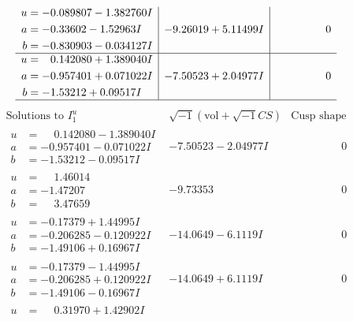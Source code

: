 \documentclass[1p]{elsarticle_modified}
\theoremstyle{definition}
\newcommand{\I}{\sqrt{-1}}
\begin{document}
$$\begin{array}{c|c|c}
\begin{aligned}
u &= -0.089807 - 1.382760 I \\
a &= -0.33602 - 1.52963 I \\
b &= -0.830903 - 0.034127 I\end{aligned}
 & -9.26019 + 5.11499 I & \phantom{-0.000000 } 0 \\ \hline\begin{aligned}
u &= \phantom{-}0.142080 + 1.389040 I \\
a &= -0.957401 + 0.071022 I \\
b &= -1.53212 + 0.09517 I\end{aligned}
 & -7.50523 + 2.04977 I & \phantom{-0.000000 } 0\\
 \hline 
 \end{array}$$\newpage$$\begin{array}{c|c|c}  
\text{Solutions to }I^u_{1}& \I (\text{vol} + \sqrt{-1}CS) & \text{Cusp shape}\\
 \hline 
\begin{aligned}
u &= \phantom{-}0.142080 - 1.389040 I \\
a &= -0.957401 - 0.071022 I \\
b &= -1.53212 - 0.09517 I\end{aligned}
 & -7.50523 - 2.04977 I & \phantom{-0.000000 } 0 \\ \hline\begin{aligned}
u &= \phantom{-}1.46014\phantom{ +0.000000I} \\
a &= -1.47207\phantom{ +0.000000I} \\
b &= \phantom{-}3.47659\phantom{ +0.000000I}\end{aligned}
 & -9.73353\phantom{ +0.000000I} & \phantom{-0.000000 } 0 \\ \hline\begin{aligned}
u &= -0.17379 + 1.44995 I \\
a &= -0.206285 - 0.120922 I \\
b &= -1.49106 + 0.16967 I\end{aligned}
 & -14.0649 - 6.1119 I & \phantom{-0.000000 } 0 \\ \hline\begin{aligned}
u &= -0.17379 - 1.44995 I \\
a &= -0.206285 + 0.120922 I \\
b &= -1.49106 - 0.16967 I\end{aligned}
 & -14.0649 + 6.1119 I & \phantom{-0.000000 } 0 \\ \hline\begin{aligned}
u &= \phantom{-}0.31970 + 1.42902 I \\

\end{aligned}
\end{array}$$
\end{document}
